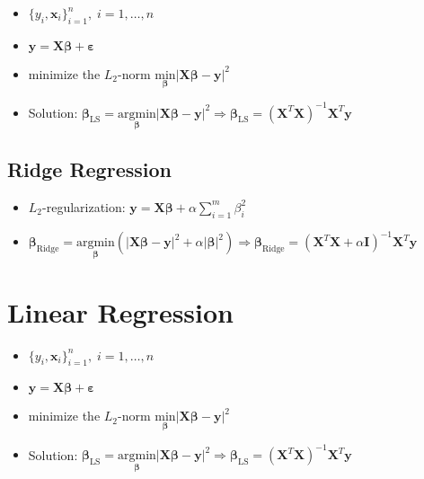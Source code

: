 \documentclass[11pt]{article}
\begin{document}
\begin{itemize}
    \item $\{y_i, \boldsymbol{x}_i\}_{i=1}^n,\; i=1,\dots,n$
    \item $\boldsymbol{y} = \boldsymbol{X}\boldsymbol{\beta} + \boldsymbol{\varepsilon}$
    \item minimize the \(L_2\)-norm $\underset{\boldsymbol{\beta}}{\text{min}}{\big|}\boldsymbol{X}\boldsymbol{\beta} - \boldsymbol{y}{\big|}^2$
    \item Solution: $\boldsymbol{\beta}_{\text{LS}} = \underset{\boldsymbol{\beta}}{\text{arg}\text{min}}{\big|}\boldsymbol{X}\boldsymbol{\beta} - \boldsymbol{y}{\big|}^2 \Rightarrow \boldsymbol{\beta}_{\text{LS}} = \left(\boldsymbol{X}^T\boldsymbol{X}\right)^{-1}\boldsymbol{X}^T\boldsymbol{y}$
\end{itemize}

\hypertarget{ridge-regression}{%
\subsection*{Ridge Regression}\label{ridge-regression}}

\begin{itemize}
    \item $L_2$-regularization: $\boldsymbol{y} = \boldsymbol{X}\boldsymbol{\beta} + \alpha\sum\limits_{i=1}^m\beta^2_i$
    \item $\boldsymbol{\beta}_{\text{Ridge}} = \underset{\boldsymbol{\beta}}{\text{arg}\text{min}}\left({\big|}\boldsymbol{X}\boldsymbol{\beta} - \boldsymbol{y}{\big|}^2 + \alpha{\big|}\boldsymbol{\beta}{\big|}^2\right) \Rightarrow \boldsymbol{\beta}_{\text{Ridge}} = \left(\boldsymbol{X}^T\boldsymbol{X} + \alpha \boldsymbol{I}\right)^{-1}\boldsymbol{X}^T\boldsymbol{y}$
\end{itemize}

\newpage
\hypertarget{linear-regression}{%
\section*{Linear Regression}\label{linear-regression}}

\begin{itemize}
    \item $\{y_i, \boldsymbol{x}_i\}_{i=1}^n,\; i=1,\dots,n$
    \item $\boldsymbol{y} = \boldsymbol{X}\boldsymbol{\beta} + \boldsymbol{\varepsilon}$
    \item minimize the \(L_2\)-norm $\underset{\boldsymbol{\beta}}{\text{min}}{\big|}\boldsymbol{X}\boldsymbol{\beta} - \boldsymbol{y}{\big|}^2$
    \item Solution: $\boldsymbol{\beta}_{\text{LS}} = \underset{\boldsymbol{\beta}}{\text{arg}\text{min}}{\big|}\boldsymbol{X}\boldsymbol{\beta} - \boldsymbol{y}{\big|}^2 \Rightarrow \boldsymbol{\beta}_{\text{LS}} = \left(\boldsymbol{X}^T\boldsymbol{X}\right)^{-1}\boldsymbol{X}^T\boldsymbol{y}$
\end{itemize}
\end{document}
